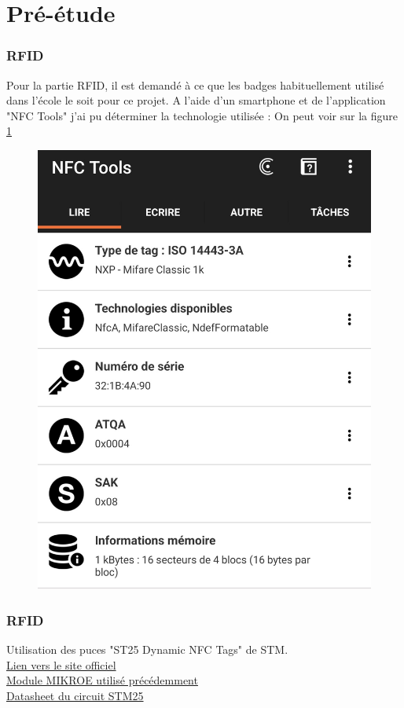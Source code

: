 \part{Pré-étude}

\section{RFID}

Pour la partie RFID, il est demandé à ce que les badges habituellement utilisé dans l'école le soit pour ce projet. A l'aide d'un smartphone et de l'application "NFC Tools" j'ai pu déterminer la technologie utilisée :
On peut voir sur la figure \ref{fig:screenshotnfctools}


\begin{figure}[h]
	\centering
	\includegraphics[width=0.7\linewidth]{2312_Images/2312_Pre-etude/Screenshot_NFC_Tools}
	\caption{}
	\label{fig:screenshotnfctools}
\end{figure}

\section{RFID}
Utilisation des puces "ST25 Dynamic NFC Tags" de STM. \\
\href{https://www.st.com/en/nfc/st25-dynamic-nfc-tags.html}{Lien vers le site officiel} \\
\href{https://www.mikroe.com/rfid-click}{Module MIKROE utilisé précédemment} \\
\href{https://www.st.com/content/ccc/resource/technical/document/datasheet/e2/ed/a5/4c/6b/42/46/91/DM00097458.pdf/files/DM00097458.pdf/jcr:content/translations/en.DM00097458.pdf}{Datasheet du circuit STM25}